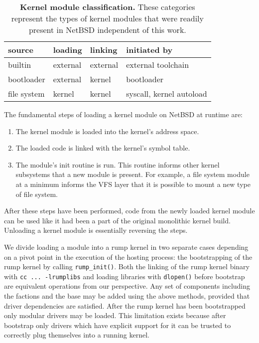 \begin{table}
\begin{tabular}{|l|l|l|l|}
\hline
source & loading & linking & initiated by \\
\hline
\hline
builtin & external & external & external toolchain \\
\hline
bootloader & external & kernel & bootloader \\
\hline
file system & kernel & kernel & syscall, kernel autoload \\
\hline
\end{tabular}
\caption[Kernel module classification]{
\textbf{Kernel module classification.}
These categories represent the types of kernel modules that were readily
present in NetBSD independent of this work.
}
\label{tab:kernmod}
\end{table}

The fundamental steps of loading a kernel module on NetBSD at
runtime are:

\begin{enumerate}
\item	The kernel module is loaded into the kernel's address space.

\item   The loaded code is linked with the kernel's symbol table.

\item   The module's init routine is run.  This routine informs other kernel
	subsystems that a new module is present.  For example, a
	file system module at a minimum informs the VFS layer that
	it is possible to mount a new type of file system.
\end{enumerate}

After these steps have been performed, code from the newly loaded
kernel module can be used like it had been a part of the original
monolithic kernel build.  Unloading a kernel module is essentially
reversing the steps.

We divide loading a module into a rump kernel in two separate cases
depending on a pivot point in the execution of the hosting process: the bootstrapping of the
rump kernel by calling \verb+rump_init()+.  Both the linking of the rump
kernel binary with \texttt{cc~...~-lrumplibs} and loading libraries with
\texttt{dlopen()} before bootstrap are equivalent operations from our
perspective.  Any set of components including the factions and the base
may be added using the above methods, provided that driver dependencies
are satisfied.  After the rump kernel has been bootstrapped only modular
drivers may be loaded.  This limitation exists because after bootstrap
only drivers which have explicit support for it can be trusted to
correctly plug themselves into a running kernel.

